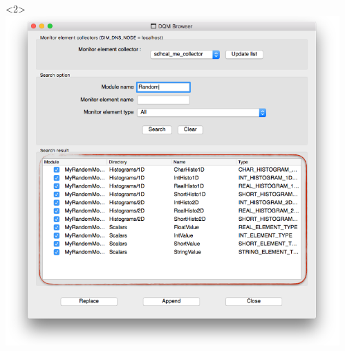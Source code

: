 \documentclass[8pt]{beamer}
\begin{document}
\begin{frame}
\begin{overlayarea}{\textwidth}{\textheight}
\begin{columns}
	\begin{center}
         \begin{onlyenv}<2>\includegraphics[width=1.1\textwidth]{figs/Browser/Browser_SearchResult}\end{onlyenv}
               \end{center}

         \begin{itemize}
      \end{itemize}

           \end{columns}
               \end{overlayarea}
    
  \end{frame}
  
\end{document}
